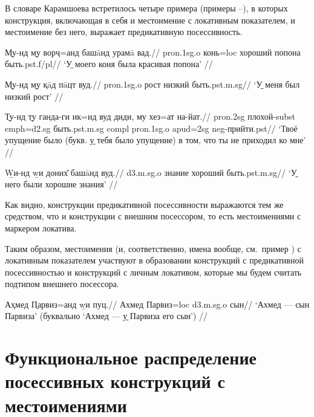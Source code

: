 В словаре Карамшоева встретилось четыре примера (примеры –), в которых конструкция, включающая в себя и местоимение с локативным показателем, и местоимение без него, выражает предикативную посессивность.

\begingl
\gla \b{Му-нд} \b{му} ворҷ=анд башāнд урамā вад.//
 {\sc pron.1sg.o} конь={\sc loc} хороший попона быть.{\sc pst.f/pl}//
\glft ‘\b{У моего} коня была красивая попона’ //
\endgl \xe

\begingl
\gla \b{Му-нд} \b{му} қāд пāцт вуд.//
 {\sc pron.1sg.o} рост низкий быть.{\sc pst.m.sg}//
\glft ‘\b{У меня} был низкий рост’ //
\endgl \xe

\begingl
\gla \b{Ту-нд} \b{ту} ганда-ги ик=ид вуд диди, му хез=ат на-йат.//
 {\sc pron.2sg} плохой-{\sc subst} {\sc emph=d2.sg} быть.{\sc pst.m.sg} {\sc compl} {\sc pron.1sg.o} {\sc apud=2sg} {\sc neg}-прийти.{\sc pst}//
\glft ‘Твоё упущение было (букв. \b{у тебя} было упущение) в том, что ты не приходил ко мне’ //
\endgl \xe

\begingl
\gla \b{Wи-нд} \b{wи} доних̌ башāнд вуд.//
 {\sc d3.m.sg.o} знание хороший быть.{\sc pst.m.sg}//
\glft ‘\b{У него} были хорошие знания’ //
\endgl \xe

Как видно, конструкции предикативной посессивности выражаются тем же средством, что и конструкции с внешним посессором, то есть местоимениями с маркером локатива.

Таким образом, местоимения (и, соответственно, имена вообще, см.~пример ) с локативным показателем участвуют в образовании конструкций с предикативной посессивностью и конструкций с личным локативом, которые мы будем считать подтипом внешнего посессора.

\begingl
\gla Аҳмед \b{Парвиз=анд} \b{wи} пуц.//
\glc Ахмед Парвиз={\sc loc} {\sc d3.m.sg.o} сын//
\glft ‘Ахмед — сын Парвиза’ (буквально ‘Ахмед — \b{у Парвиза его} сын’) \trailingcitation{[элицитация]}//
\endgl \xe

\section{Функциональное распределение посессивных конструкций с местоимениями} \label{poss-distrib}

